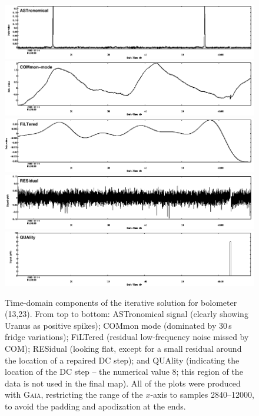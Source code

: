 \documentclass[twoside,11pt]{article}
\newcommand{\xref}[3]{#1}
\renewcommand{\_}{\texttt{\symbol{95}}}
\newcommand{\gaia}{\xref{\textsc{Gaia}}{sun214}{}}
\begin{document}
\begin{figure}
\begin{center}
\includegraphics[width=\linewidth]{sc19_iter_ast} \\
\includegraphics[width=\linewidth]{sc19_iter_com} \\
\includegraphics[width=\linewidth]{sc19_iter_flt} \\
\includegraphics[width=\linewidth]{sc19_iter_res} \\
\includegraphics[width=\linewidth]{sc19_iter_qua} \\
\caption{Time-domain components of the iterative solution for
  bolometer (13,23). From top to bottom: ASTronomical signal (clearly
  showing Uranus as positive spikes); COMmon mode (dominated by 30\,s
  fridge variations); FiLTered (residual low-frequency noise missed by
  COM); RESidual (looking flat, except for a small residual around the
  location of a repaired DC step); and QUAlity (indicating the
  location of the DC step -- the numerical value 8; this region of the
  data is not used in the final map). All of the plots were produced
  with \gaia, restricting the range of the $x$-axis to samples
  2840--12000, to avoid the padding and apodization at the ends.}
\label{fig:itercomp}
\end{center}
\end{figure}
\end{document}
